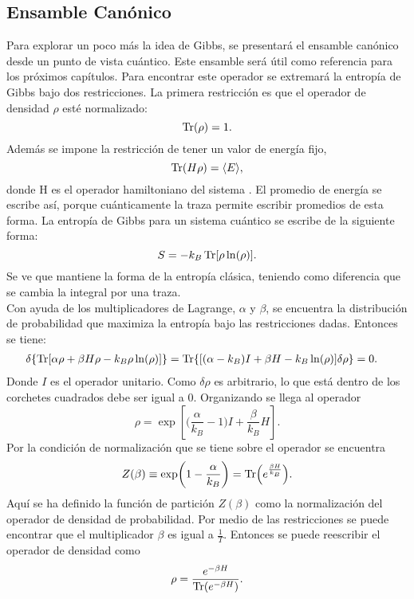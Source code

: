 \subsection{Ensamble Canónico}
Para explorar un poco más la idea de Gibbs, se presentará el ensamble canónico desde un punto de vista cuántico. Este ensamble será útil como referencia para los próximos capítulos. Para encontrar este operador se extremará la entropía de Gibbs bajo dos restricciones. La primera restricción es que el operador de densidad $\rho$ esté normalizado:
\begin{equation}
\Tr(\rho)=1.
\end{equation}
Además se impone la restricción de tener un valor de energía fijo,
\begin{equation}
\Tr(H \rho)= \langle E \rangle,
\end{equation}
donde H  es el operador hamiltoniano del sistema  \cite{ReichlStat}. El promedio de energía se escribe así, porque cuánticamente la traza permite escribir promedios de esta forma. La entropía de Gibbs para un sistema cuántico se escribe de la siguiente forma:
\begin{equation}
S=-k_{B} \Tr[\rho \ln (\rho)].
\end{equation}
Se ve que mantiene la forma de la entropía clásica, teniendo como diferencia que se cambia la integral por una traza. \\
Con ayuda de los multiplicadores de Lagrange, $\alpha$ y $\beta$, se encuentra la distribución de probabilidad que maximiza la entropía bajo las restricciones dadas. Entonces se tiene:
\begin{align}
\delta \{ \Tr [ \alpha \rho + \beta H \rho - k_{B} \rho \ln (\rho)] \} 
&= \Tr \{ [(\alpha - k_{B})I + \beta H - k_{B} \ln (\rho) ] \delta \rho \}=0.
\end{align}
Donde $I$ es el operador unitario. Como $\delta \rho$ es arbitrario, lo que está dentro de los corchetes cuadrados debe ser igual a 0. Organizando se llega al operador
\begin{equation}
\rho= \exp [ \bigg( \frac{ \alpha }{k_{B}}-1 \bigg) I + \frac{\beta}{k_{B}}H ].
\end{equation}
Por la condición de normalización que se tiene sobre el operador se encuentra
\begin{equation}
Z(\beta) \equiv \exp (1- \frac{ \alpha }{k_{B}}) = \Tr (e^{\frac{\beta H}{k_{B}}}).
\end{equation}
Aquí se ha definido la función de partición $Z(\beta)$ como la normalización del operador de densidad de probabilidad. Por medio de las restricciones se puede encontrar que el multiplicador $\beta$ es igual a $\frac{1}{T}$. Entonces se puede reescribir el operador de densidad  como
\begin{equation}
\rho = \frac{ e^{-\beta H}}{\Tr( e^{-\beta H})}.
\end{equation}

